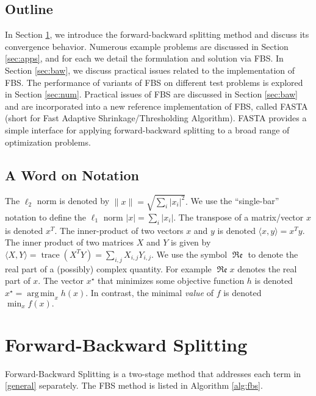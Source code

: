 \documentclass{amsart}
\renewcommand\Re{\operatorname{\mathfrak{Re}}}
\newcommand{\ra}{\rangle}
\newcommand{\la}{\langle}
\newcommand{\opt}{^\star}
\DeclareMathOperator*{\argmin}{arg\,min}
\DeclareMathOperator{\trace}{trace}
\theoremstyle{definition}
\begin{document}
 \subsection{Outline}
 
  In Section \ref{sec:fbs}, we introduce the forward-backward splitting method and discuss its convergence behavior.  Numerous example problems are discussed in Section \ref{sec:apps}, and for each we detail the formulation and solution via FBS.  In Section \ref{sec:baw}, we discuss practical issues related to the implementation of FBS.  The performance of variants of FBS on different test problems is explored in Section \ref{sec:num}.
Practical issues of FBS are discussed in Section \ref{sec:baw} and are incorporated into a new reference implementation of FBS, called FASTA (short for Fast Adaptive Shrinkage/Thresholding Algorithm).  FASTA provides a simple interface for applying forward-backward splitting to a broad range of optimization problems.

  
  
     
 \subsection{A Word on Notation}
 The  $\ell_2$ norm is denoted by
 $\|x\| = \sqrt{\sum_i |x_i|^2}.$
We use the ``single-bar'' notation to define the $\ell_1$ norm $|x| = \sum_i |x_i|.$
 The transpose of a matrix/vector $x$ is denoted $x^T.$  The inner-product of two vectors $x$ and $y$ is denoted $\la x,y\ra = x^Ty.$  The inner product of two matrices $X$ and $Y$ is given by $\la X,Y\ra= \trace(X^TY) = \sum_{i,j} X_{i,j}Y_{i,j}.$ We use the symbol $\Re$ to denote the real part of a (possibly) complex quantity. For example $\Re x$ denotes the real part of $x.$  
The vector $x\opt$ that minimizes some objective function $h$ is denoted $x\opt = \argmin_x h(x).$   In contrast, the minimal {\em value} of $f$ is denoted $\min_x f(x).$
   
  
\section{Forward-Backward Splitting} \label{sec:fbs}
Forward-Backward Splitting is a two-stage method that addresses each term in \eqref{general} separately.  The FBS method is listed in Algorithm \ref{alg:fbs}.
\end{document}
